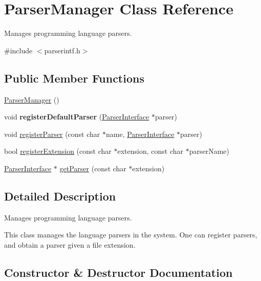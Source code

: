 \hypertarget{class_parser_manager}{}\section{Parser\+Manager Class Reference}
\label{class_parser_manager}


Manages programming language parsers.  




{\ttfamily \#include $<$parserintf.\+h$>$}

\subsection*{Public Member Functions}
\begin{DoxyCompactItemize}
\item 
\mbox{\hyperlink{class_parser_manager_a6d40c2ea132a10d04515db91b170023c}{Parser\+Manager}} ()
\item 
\mbox{\label{class_parser_manager_a14594ae0488507a53c9700d7b2722719}} 
void {\bfseries register\+Default\+Parser} (\mbox{\hyperlink{class_parser_interface}{Parser\+Interface}} $\ast$parser)
\item 
void \mbox{\hyperlink{class_parser_manager_a04ff0e1b281d0b10b42688f6bce1d296}{register\+Parser}} (const char $\ast$name, \mbox{\hyperlink{class_parser_interface}{Parser\+Interface}} $\ast$parser)
\item 
bool \mbox{\hyperlink{class_parser_manager_a2184813c0cd50eda1cf6ce74bf50d8b5}{register\+Extension}} (const char $\ast$extension, const char $\ast$parser\+Name)
\item 
\mbox{\hyperlink{class_parser_interface}{Parser\+Interface}} $\ast$ \mbox{\hyperlink{class_parser_manager_a69f9874c260df7559242ec5833051ac5}{get\+Parser}} (const char $\ast$extension)
\end{DoxyCompactItemize}


\subsection{Detailed Description}
Manages programming language parsers. 

This class manages the language parsers in the system. One can register parsers, and obtain a parser given a file extension. 

\subsection{Constructor \& Destructor Documentation}
\mbox{\label{class_parser_manager_a6d40c2ea132a10d04515db91b170023c}} 

